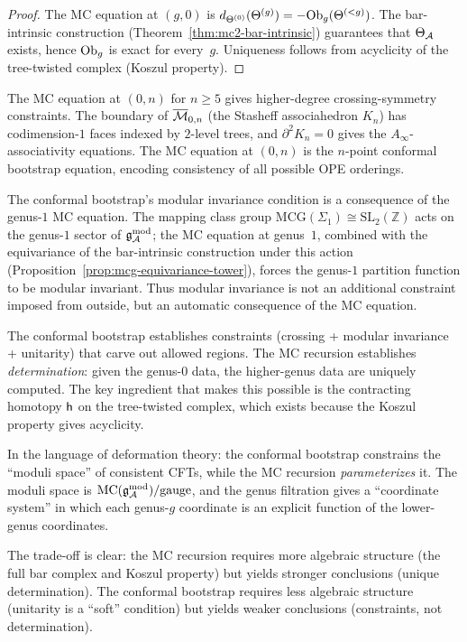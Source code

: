 \begin{proof}
The MC equation at $(g, 0)$ is
$d_{\Theta^{(0)}}(\Theta^{(g)}) = -\mathrm{Ob}_g(\Theta^{(<g)})$.
The bar-intrinsic construction
(Theorem~\ref{thm:mc2-bar-intrinsic}) guarantees that
$\Theta_{\mathcal{A}}$ exists, hence $\mathrm{Ob}_g$ is exact for
every~$g$. Uniqueness follows from acyclicity of the
tree-twisted complex (Koszul property).
\end{proof}

\begin{remark}
\label{rem:thqg-VII-higher-degree-crossing}
The MC equation at $(0, n)$ for $n \geq 5$ gives higher-degree
crossing-symmetry constraints. The boundary of
$\overline{\mathcal{M}}_{0,n}$ (the Stasheff associahedron $K_n$) has
codimension-$1$ faces indexed by $2$-level trees, and
$\partial^2 K_n = 0$ gives the $A_\infty$-associativity
equations. The MC equation at $(0, n)$ is the $n$-point
conformal bootstrap equation, encoding consistency of all
possible OPE orderings.
\end{remark}

\begin{remark}
\label{rem:thqg-VII-modular-as-mc}
The conformal bootstrap's modular invariance condition is
a consequence of the genus-$1$ MC equation. The mapping class
group $\mathrm{MCG}(\Sigma_1) \cong \mathrm{SL}_2(\mathbb{Z})$
acts on the genus-$1$ sector of $\mathfrak{g}_{\mathcal{A}}^{\mathrm{mod}}$; the MC equation at
genus~$1$, combined with the equivariance of the bar-intrinsic
construction under this action
(Proposition~\ref{prop:mcg-equivariance-tower}), forces the
genus-$1$ partition function to be modular invariant.
Thus modular invariance is not an additional constraint
imposed from outside, but an automatic consequence of the
MC equation.
\end{remark}

\begin{remark}
\label{rem:thqg-VII-mc-stronger}
The conformal bootstrap establishes constraints
(crossing + modular invariance + unitarity) that carve out
allowed regions. The MC recursion establishes
\emph{determination}: given the genus-$0$ data, the higher-genus
data are uniquely computed. The key ingredient that makes
this possible is the contracting homotopy
$\mathsf{h}$ on the tree-twisted complex, which exists because
the Koszul property gives acyclicity.

In the language of deformation theory: the conformal bootstrap
constrains the ``moduli space'' of consistent CFTs, while the
MC recursion \emph{parameterizes} it. The moduli space is
$\text{MC}(\mathfrak{g}_{\mathcal{A}}^{\mathrm{mod}})/\text{gauge}$, and the genus filtration gives a
``coordinate system'' in which each genus-$g$ coordinate is
an explicit function of the lower-genus coordinates.

The trade-off is clear: the MC recursion requires more
algebraic structure (the full bar complex and Koszul property)
but yields stronger conclusions (unique determination). The
conformal bootstrap requires less algebraic structure (unitarity
is a ``soft'' condition) but yields weaker conclusions
(constraints, not determination).
\end{remark}

